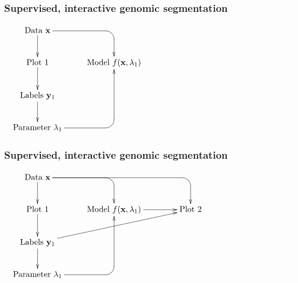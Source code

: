 \documentclass{beamer}
\begin{document}
\begin{frame}
  \frametitle{Supervised, interactive genomic segmentation}
  \small
  \begin{displaymath}
  \xymatrix{
    \text{Data $\mathbf x$}
    \ar `[r] [dr] 
    \ar [d]
    & \text{ }
    & \text{ }
    & \text{ }
    \\
    \text{Plot 1} 
    \ar [d]
    & 
    \text{Model $f(\mathbf x, \lambda_1)$} 
    &
    \color{white}{\text{Plot 2} }
    & 
    \color{white}{\text{Model $f(\mathbf x, \lambda_2)$} }
    \\
    \text{Labels $\mathbf y_1$}       
    \ar [d]
    &
    &
    \color{white}{\text{Labels $\mathbf y_2$}}
    \\
    \text{Parameter $\lambda_1$} 
    \ar `r[ruu] [ruu]
    & \text{ }
    & 
    \color{white}{\text{Parameter $\lambda_2$}}
  }
  \end{displaymath}
\end{frame}

\begin{frame}
  \frametitle{Supervised, interactive genomic segmentation}
  \small
  \begin{displaymath}
  \xymatrix{
    \text{Data $\mathbf x$}
    \ar `[r] [dr] 
    \ar `r[rr] [drr] 
    \ar [d]
    & \text{ }
    & \text{ }
    & \text{ }
    \\
    \text{Plot 1} 
    \ar [d]
    & 
    \text{Model $f(\mathbf x, \lambda_1)$} 
    \ar [r]
    &
    \text{Plot 2} 
    & 
    \color{white}{\text{Model $f(\mathbf x, \lambda_2)$} }
    \\
    \text{Labels $\mathbf y_1$}       
    \ar [d]
    \ar [rru]
    &
    &
    \color{white}{\text{Labels $\mathbf y_2$}}
    \\
    \text{Parameter $\lambda_1$} 
    \ar `r[ruu] [ruu]
    & \text{ }
    & 
    \color{white}{\text{Parameter $\lambda_2$}}
  }
  \end{displaymath}
\end{frame}
\end{document}
